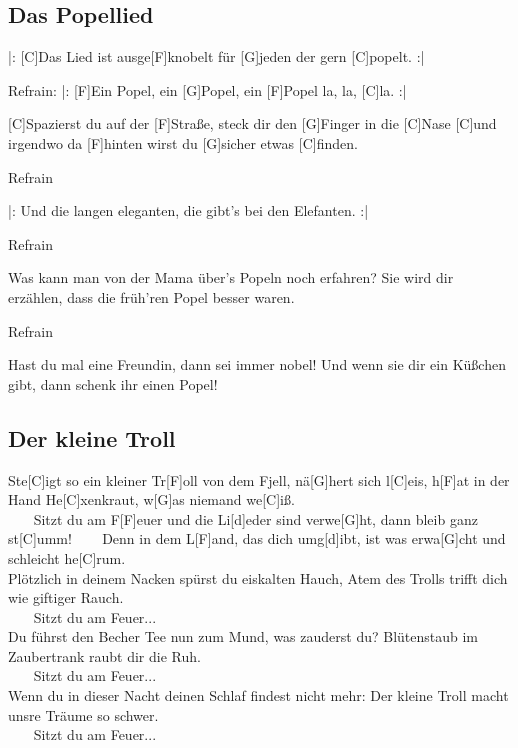\documentclass[10pt,a5paper,twoside]{scrbook}
\begin{document}
  	
\newpage  
  	

\subsection{Das Popellied}
\begin{guitar}
|: [C]Das Lied ist ausge[F]knobelt für [G]jeden der gern [C]popelt. :|


Refrain:
|: [F]Ein Popel, ein [G]Popel, ein [F]Popel la, la, [C]la. :|


[C]Spazierst du auf der [F]Straße, steck dir den [G]Finger in die [C]Nase
[C]und irgendwo da [F]hinten wirst du [G]sicher etwas [C]finden.

Refrain

|: Und die langen eleganten, die gibt's bei den Elefanten. :|

Refrain

Was kann man von der Mama über's Popeln noch erfahren?
Sie wird dir erzählen, dass die früh'ren Popel besser waren.

Refrain

Hast du mal eine Freundin, dann sei immer nobel!
Und wenn sie dir ein Küßchen gibt, dann schenk ihr einen Popel!
\end{guitar}

  	
\newpage  
  	
\subsection{Der kleine Troll}
\begin{guitar}
Ste[C]igt so ein kleiner Tr[F]oll von dem Fjell, nä[G]hert sich l[C]eis,
h[F]at in der Hand He[C]xenkraut, w[G]as niemand we[C]iß.\\


~~~ Sitzt du am F[F]euer und die Li[d]eder sind verwe[G]ht, dann bleib ganz st[C]umm!
~~~ Denn in dem L[F]and, das dich umg[d]ibt, ist was erwa[G]cht und schleicht he[C]rum.\\


Plötzlich in deinem Nacken spürst du eiskalten Hauch,
Atem des Trolls trifft dich wie giftiger Rauch.\\

~~~ Sitzt du am Feuer... \\

Du führst den Becher Tee nun zum Mund, was zauderst du? 
Blütenstaub im Zaubertrank raubt dir die Ruh.\\

~~~ Sitzt du am Feuer... \\

Wenn du in dieser Nacht deinen Schlaf findest nicht mehr:
Der kleine Troll macht unsre Träume so schwer.\\

~~~ Sitzt du am Feuer...
\end{guitar}
\end{document}
